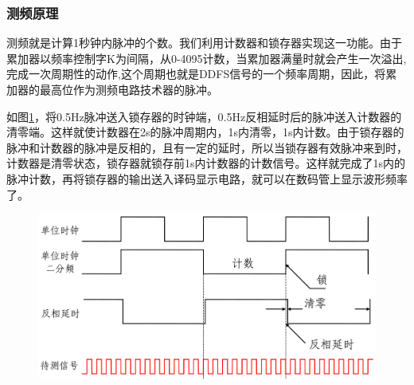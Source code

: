 \documentclass[12pt]{article}
\begin{document}
\subsubsection{测频原理}
测频就是计算1秒钟内脉冲的个数。我们利用计数器和锁存器实现这一功能。由于累加器以频率控制字K为间隔，从0-4095计数，当累加器满量时就会产生一次溢出,完成一次周期性的动作,这个周期也就是DDFS信号的一个频率周期，因此，将累加器的最高位作为测频电路技术器的脉冲。\par
如图\ref{fig:cepinyuanli}，将0.5Hz脉冲送入锁存器的时钟端，0.5Hz反相延时后的脉冲送入计数器的清零端。这样就使计数器在2s的脉冲周期内，1s内清零，1s内计数。由于锁存器的脉冲和计数器的脉冲是反相的，且有一定的延时，所以当锁存器有效脉冲来到时，计数器是清零状态，锁存器就锁存前1s内计数器的计数信号。这样就完成了1s内的脉冲计数，再将锁存器的输出送入译码显示电路，就可以在数码管上显示波形频率了。
\begin{figure}[hp]
	\centering  
		\includegraphics[width=\textwidth]{picture/image120.png} 
	\caption{}
	\label{fig:cepinyuanli}   
\end{figure}
\end{document}
